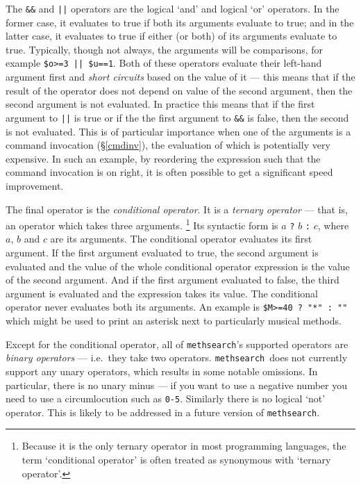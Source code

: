 \documentclass[a4paper,11pt,oneside]{book}
\def\textitidx#1{\textit{#1}\index{#1}}
\def\methsearch{\texttt{meth\-search}}
\newcommand{\sref}[1]{\hyperref[#1]{\S\ref{#1}}}
\begin{document}
The \verb+&&+ and \verb+||+ operators are the logical `and' and logical `or'
operators.  
In the former case, it evaluates to true if both its arguments 
evaluate to true; and in the latter case, it evaluates to true if either 
(or both) of its arguments evaluate to true.  Typically, though not always, 
the arguments will be comparisons, for example \texttt{\$o>=3 || \$u==1}.
Both of these operators evaluate their left-hand argument first and 
\textit{short circuits} 
based on the value of it --- this means that if
the result of the operator does not depend on value of the second argument,
then the second argument is not evaluated.  In practice this means that if
the first argument to \verb+||+ is true or if the 
the first argument to \verb+&&+ is false, then the second is not evaluated.
This is of particular importance when one of the arguments is a command
invocation (\sref{cmdinv}), the evaluation of which is potentially very
expensive. In such an example, by reordering the expression such that the
command invocation is on right, it is often possible to get a significant
speed improvement.

The final operator is the \textitidx{conditional operator}.  It is a 
\textit{ternary operator} --- 
that is, an operator which takes three arguments.%
\footnote{Because it is the only ternary operator in most
programming languages, the term `conditional operator' is often treated
as synonymous with `ternary operator'.}  Its syntactic form is 
$a$ \verb+?+ $b$ \verb+:+ $c$, where $a$, $b$ and $c$ are its arguments.
The conditional operator evaluates its first argument.  If the first
argument evaluated to true, the second argument is evaluated and the
value of the whole conditional operator expression is the value of the 
second argument.  And if the first argument evaluated to false, the third
argument is evaluated and the expression takes its value.  The conditional
operator never evaluates both its arguments.  An example is 
\verb+$M>=40 ? "*" : ""+ which might be used to print an asterisk next
to particularly musical methods.

Except for the conditional operator, all of \methsearch's supported operators
are \textit{binary operators} 
--- i.e.\ they take two operators.  
\methsearch\ does not currently support any unary operators,%
 which results in
some notable omissions.   In particular, there is no unary 
minus --- if you want to use a negative 
number you need to use a circumlocution such as \verb+0-5+.  
Similarly there is no logical `not' operator.
This is likely to be addressed in a future version of \methsearch.
\end{document}
